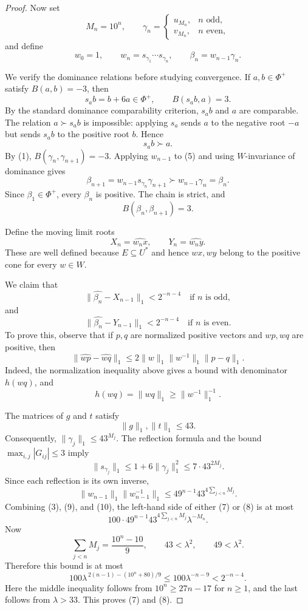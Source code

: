 \documentclass[11pt,reqno]{amsart}
\theoremstyle{plain}
\theoremstyle{definition}
\theoremstyle{remark}
\numberwithin{equation}{section}
\begin{document}
\begin{proof}
Now set
\[
M_n=10^n,\qquad
\gamma_n=
\begin{cases}
u_{M_n},& n\text{ odd},\\
v_{M_n},& n\text{ even},
\end{cases}
\]
and define
\[
w_0=1,\qquad
w_n=s_{\gamma_1}\cdots s_{\gamma_n},
\qquad
\beta_n=w_{n-1}\gamma_n.
\tag{4}
\]

We verify the dominance relations before studying convergence.
If $a,b\in\Phi^+$ satisfy $B(a,b)=-3$, then
\[
s_ab=b+6a\in\Phi^+,
\qquad B(s_ab,a)=3.
\]
By the standard dominance comparability criterion, $s_ab$ and $a$
are comparable. The relation $a\succ s_ab$ is impossible:
applying $s_a$ sends $a$ to the negative root $-a$ but sends
$s_ab$ to the positive root $b$. Hence
\[
s_ab\succ a.
\tag{5}
\]
By (1), $B(\gamma_n,\gamma_{n+1})=-3$. Applying $w_{n-1}$ to (5)
and using $W$-invariance of dominance gives
\[
\beta_{n+1}
=w_{n-1}s_{\gamma_n}\gamma_{n+1}
\succ w_{n-1}\gamma_n
=\beta_n.
\]
Since $\beta_1\in\Phi^+$, every $\beta_n$ is positive. The chain is
strict, and
\[
B(\beta_n,\beta_{n+1})=3.
\tag{6}
\]

Define the moving limit roots
\[
X_n=\widehat{w_nx},\qquad
Y_n=\widehat{w_ny}.
\]
These are well defined because $E\subseteq U^*$ and hence
$wx,wy$ belong to the positive cone for every $w\in W$.

We claim that
\[
\|\widehat{\beta_n}-X_{n-1}\|_1<2^{-n-4}
\quad\text{if }n\text{ is odd},
\tag{7}
\]
and
\[
\|\widehat{\beta_n}-Y_{n-1}\|_1<2^{-n-4}
\quad\text{if }n\text{ is even}.
\tag{8}
\]
To prove this, observe that if $p,q$ are normalized positive vectors
and $wp,wq$ are positive, then
\[
\|\widehat{wp}-\widehat{wq}\|_1
\leq
2\|w\|_1\|w^{-1}\|_1\|p-q\|_1.
\tag{9}
\]
Indeed, the normalization inequality above gives a bound with
denominator $h(wq)$, and
\[
h(wq)=\|wq\|_1\geq\|w^{-1}\|_1^{-1}.
\]

The matrices of $g$ and $t$ satisfy
\[
\|g\|_1,\|t\|_1\leq43.
\]
Consequently, $\|\gamma_j\|_1\leq43^{M_j}$. The reflection formula
and the bound $\max_{i,j}|G_{ij}|\leq3$ imply
\[
\|s_{\gamma_j}\|_1
\leq1+6\|\gamma_j\|_1^2
\leq7\cdot43^{2M_j}.
\]
Since each reflection is its own inverse,
\[
\|w_{n-1}\|_1\|w_{n-1}^{-1}\|_1
\leq49^{n-1}43^{4\sum_{j<n}M_j}.
\tag{10}
\]
Combining (3), (9), and (10), the left-hand side of either
(7) or (8) is at most
\[
100\cdot49^{n-1}
43^{4\sum_{j<n}M_j}\lambda^{-M_n}.
\]
Now
\[
\sum_{j<n}M_j=\frac{10^n-10}{9},
\qquad
43<\lambda^2,\qquad49<\lambda^2.
\]
Therefore this bound is at most
\[
100\lambda^{\,2(n-1)-(10^n+80)/9}
\leq100\lambda^{-n-9}
<2^{-n-4}.
\]
Here the middle inequality follows from
$10^n\geq27n-17$ for $n\geq1$, and the last follows from
$\lambda>33$. This proves (7) and (8).


\end{proof}
\end{document}
